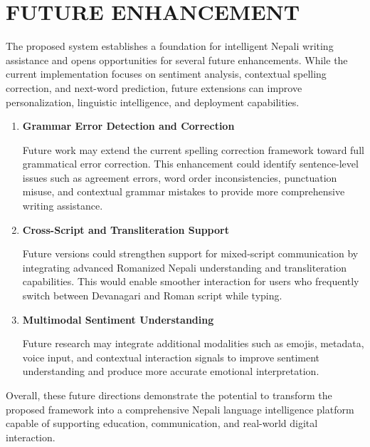\chapter*{FUTURE ENHANCEMENT}

The proposed system establishes a foundation for intelligent Nepali writing assistance and opens opportunities for several future enhancements. While the current implementation focuses on sentiment analysis, contextual spelling correction, and next-word prediction, future extensions can improve personalization, linguistic intelligence, and deployment capabilities.

\begin{enumerate}

\item \textbf{Grammar Error Detection and Correction}  

Future work may extend the current spelling correction framework toward full grammatical error correction. This enhancement could identify sentence-level issues such as agreement errors, word order inconsistencies, punctuation misuse, and contextual grammar mistakes to provide more comprehensive writing assistance.

\vspace{0.5em}

\item \textbf{Cross-Script and Transliteration Support}  

Future versions could strengthen support for mixed-script communication by integrating advanced Romanized Nepali understanding and transliteration capabilities. This would enable smoother interaction for users who frequently switch between Devanagari and Roman script while typing.

\vspace{0.5em}

\item \textbf{Multimodal Sentiment Understanding}  

Future research may integrate additional modalities such as emojis, metadata, voice input, and contextual interaction signals to improve sentiment understanding and produce more accurate emotional interpretation.
\end{enumerate}

Overall, these future directions demonstrate the potential to transform the proposed framework into a comprehensive Nepali language intelligence platform capable of supporting education, communication, and real-world digital interaction.